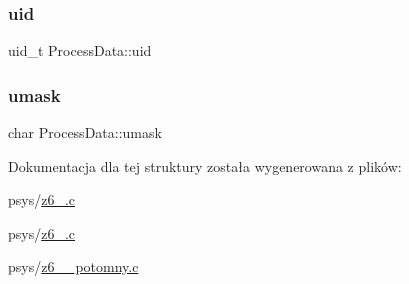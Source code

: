 \subsubsection{\texorpdfstring{uid}{uid}}
{\footnotesize\ttfamily uid\+\_\+t Process\+Data\+::uid}

\mbox{\label{structProcessData_af94edbd72c39d98950ad7b4337c46c42}} 
\subsubsection{\texorpdfstring{umask}{umask}}
{\footnotesize\ttfamily char Process\+Data\+::umask}



Dokumentacja dla tej struktury została wygenerowana z plików\+:\begin{DoxyCompactItemize}
\item 
psys/\mbox{\hyperlink{z6__11_8c}{z6\+\_.\+c}}\item 
psys/\mbox{\hyperlink{z6__12_8c}{z6\+\_.\+c}}\item 
psys/\mbox{\hyperlink{z6__12__potomny_8c}{z6\+\_\+\_\+potomny.\+c}}\end{DoxyCompactItemize}

